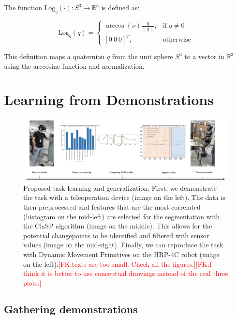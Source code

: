 \documentclass[conference]{IEEEtran}
\newcommand{\fk}[1]{\textcolor{red}{[FK:#1]}}
\begin{document}
The function \(\text{Log}_q(\cdot) : S^3 \rightarrow \mathbb{R}^3\) is defined as:

\[
\text{Log}_q(q) = \begin{cases}
\arccos(\nu) \frac{q}{\|q\|}, & \text{if } q \neq 0 \\
[0 \ 0 \ 0]^T, & \text{otherwise}
\end{cases}
\]

This definition maps a quaternion \(q\) from the unit sphere \(S^3\) to a vector in \(\mathbb{R}^3\) using the arccosine function and normalization. 

\section{Learning from Demonstrations} \label{LfD}

\begin{figure}[t]
  \centering
       \includegraphics[width=\linewidth]{img/framework.png}
       \caption{Proposed task learning and generalization. First, we demonstrate the task with a teleoperation device (image on the left). The data is then preprocessed and features that are the most correlated (histogram on the mid-left) are selected for the segmentation with the ClaSP algorithm (image on the middle). This allows for the potential changepoints to be identified and filtered with sensor values (image on the mid-right). Finally, we can reproduce the task with Dynamic Movement Primitives on the HRP-4C robot (image on the left).\fk{texts are too small. Check all the figures.}\fk{I think it is better to use conceptual drawings instead of the real three plots.}}
     \label{fig:framework}
\end{figure}

\subsection{Gathering demonstrations}
\end{document}
